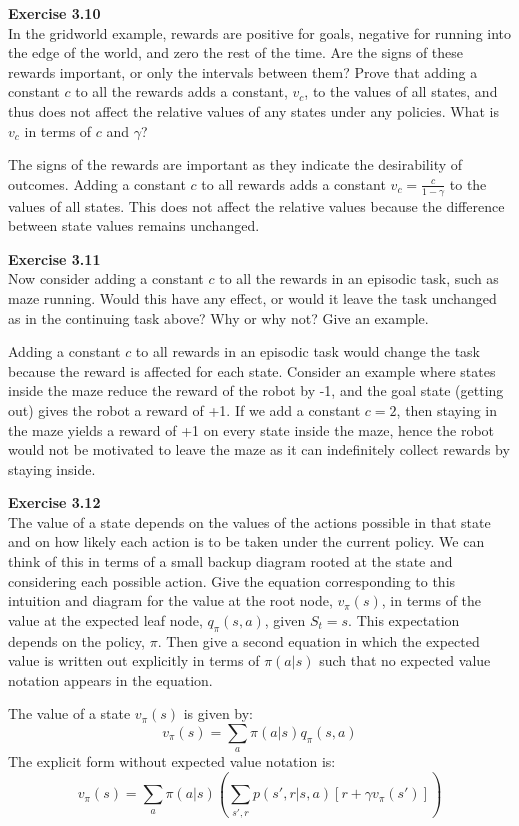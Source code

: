 \documentclass[addpoints]{exam}
\begin{document}
\begin{questions}
    \question
    \textbf{Exercise 3.10} \\ In the gridworld example, rewards are positive for goals, negative for running into the edge of the world, and zero the rest of the time. Are the signs of these rewards important, or only the intervals between them? Prove that adding a constant \( c \) to all the rewards adds a constant, \( v_c \), to the values of all states, and thus does not affect the relative values of any states under any policies. What is \( v_c \) in terms of \( c \) and \( \gamma \)?
    \begin{solution}
        The signs of the rewards are important as they indicate the desirability of outcomes. Adding a constant \( c \) to all rewards adds a constant \( v_c = \frac{c}{1 - \gamma} \) to the values of all states. This does not affect the relative values because the difference between state values remains unchanged.
    \end{solution}

    \question
    \textbf{Exercise 3.11} \\ Now consider adding a constant \( c \) to all the rewards in an episodic task, such as maze running. Would this have any effect, or would it leave the task unchanged as in the continuing task above? Why or why not? Give an example.
    \begin{solution}
        Adding a constant \( c \) to all rewards in an episodic task would change the task because the reward is affected for each state. Consider an example where states inside the maze reduce the reward of the robot by -1, and the goal state (getting out) gives the robot a reward of +1. If we add a constant $c = 2$, then staying in the maze yields a reward of +1 on every state inside the maze, hence the robot would not be motivated to leave the maze as it can indefinitely collect rewards by staying inside.
    \end{solution}

    \question
    \textbf{Exercise 3.12} \\ The value of a state depends on the values of the actions possible in that state and on how likely each action is to be taken under the current policy. We can think of this in terms of a small backup diagram rooted at the state and considering each possible action. Give the equation corresponding to this intuition and diagram for the value at the root node, \( v_{\pi}(s) \), in terms of the value at the expected leaf node, \( q_{\pi}(s,a) \), given \( S_{t}=s \). This expectation depends on the policy, \( \pi \). Then give a second equation in which the expected value is written out explicitly in terms of \( \pi(a|s) \) such that no expected value notation appears in the equation.
    \begin{solution}
        The value of a state \( v_{\pi}(s) \) is given by:
        \[
        v_{\pi}(s) = \sum_{a} \pi(a | s) q_{\pi}(s, a)
        \]
        The explicit form without expected value notation is:
        \[
        v_{\pi}(s) = \sum_{a} \pi(a | s) \left( \sum_{s', r} p(s', r | s, a) \left[ r + \gamma v_{\pi}(s') \right] \right)
        \]
    \end{solution}


\end{questions}
\end{document}
